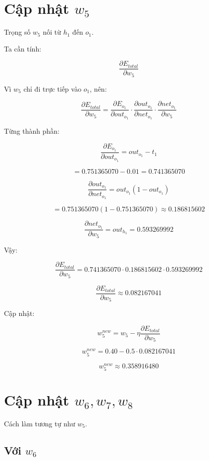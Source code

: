\documentclass[12pt,a4paper]{report}
\begin{document}
\section{Cập nhật $w_5$}

Trọng số $w_5$ nối từ $h_1$ đến $o_1$.

Ta cần tính:

\[
    \frac{\partial E_{total}}{\partial w_5}
\]

Vì $w_5$ chỉ đi trực tiếp vào $o_1$, nên:

\[
    \frac{\partial E_{total}}{\partial w_5}
    =
    \frac{\partial E_{o_1}}{\partial out_{o_1}}
    \cdot
    \frac{\partial out_{o_1}}{\partial net_{o_1}}
    \cdot
    \frac{\partial net_{o_1}}{\partial w_5}
\]

Từng thành phần:

\[
    \frac{\partial E_{o_1}}{\partial out_{o_1}}
    =
    out_{o_1}-t_1
\]

\[
    =
    0.751365070-0.01
    =
    0.741365070
\]

\[
    \frac{\partial out_{o_1}}{\partial net_{o_1}}
    =
    out_{o_1}(1-out_{o_1})
\]

\[
    =
    0.751365070(1-0.751365070)
    \approx 0.186815602
\]

\[
    \frac{\partial net_{o_1}}{\partial w_5}
    =
    out_{h_1}
    =
    0.593269992
\]

Vậy:

\[
    \frac{\partial E_{total}}{\partial w_5}
    =
    0.741365070
    \cdot
    0.186815602
    \cdot
    0.593269992
\]

\[
    \frac{\partial E_{total}}{\partial w_5}
    \approx 0.082167041
\]

Cập nhật:

\[
    w_5^{new}
    =
    w_5
    -
    \eta
    \frac{\partial E_{total}}{\partial w_5}
\]

\[
    w_5^{new}
    =
    0.40
    -
    0.5\cdot 0.082167041
\]

\[
    w_5^{new}
    \approx 0.358916480
\]

\section{Cập nhật $w_6,w_7,w_8$}

Cách làm tương tự như $w_5$.

\subsection*{Với $w_6$}
\end{document}
